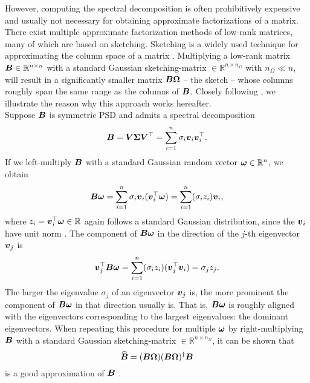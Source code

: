 However, computing the spectral
decomposition is often prohibitively expensive and usually not necessary for
obtaining approximate factorizations of a matrix. There exist multiple approximate
factorization methods of low-rank matrices, many of which are based on sketching.
Sketching is a widely used technique for approximating the column space of a matrix
\cite{halko2011finding,woodruff2014sketching,lin2017randomized,tropp2017sketching,tropp2023randomized}.
Multiplying a low-rank matrix $\boldsymbol{B} \in \mathbb{R}^{n \times n}$ with a standard Gaussian
\gls{sketching-matrix} $\in \mathbb{R}^{n \times n_{\Omega}}$ with $n_{\Omega} \ll n$, will
result in a significantly smaller matrix $\boldsymbol{B}\boldsymbol{\Omega}$ -- the sketch -- whose
columns roughly span the same range as the columns of $\boldsymbol{B}$.
Closely following \cite[section~2.1]{tropp2023randomized}, we illustrate the
reason why this approach works hereafter.\\

Suppose $\boldsymbol{B}$ is symmetric \gls{PSD} and admits a spectral decomposition
\begin{equation}
    \boldsymbol{B}
        = \boldsymbol{V} \boldsymbol{\Sigma} \boldsymbol{V}^{\top} 
        = \sum_{i=1}^n \sigma_i \boldsymbol{v}_i \boldsymbol{v}_i^{\top}.
    \label{equ:3-nystrom-sketching-spectral-decomposition}
\end{equation}
If we left-multiply $\boldsymbol{B}$ with a standard Gaussian random vector $\boldsymbol{\omega} \in \mathbb{R}^n$,
we obtain
\begin{equation}
    \boldsymbol{B}\boldsymbol{\omega}
        = \sum_{i=1}^n \sigma_i \boldsymbol{v}_i (\boldsymbol{v}_i^{\top} \boldsymbol{\omega})
        = \sum_{i=1}^n (\sigma_i  z_i) \boldsymbol{v}_i,
        \label{equ:3-nystrom-sketching-random-multiplication}
\end{equation}
where $z_i = \boldsymbol{v}_i^{\top} \boldsymbol{\omega} \in \mathbb{R}$ again follows a
standard Gaussian distribution, since the $\boldsymbol{v}_i$ have unit norm
\cite{klenke2013probability}. The component of $\boldsymbol{B}\boldsymbol{\omega}$ in the
direction of the $j$-th eigenvector $\boldsymbol{v}_j$ is
\begin{equation}
    \boldsymbol{v}_j^{\top}\boldsymbol{B}\boldsymbol{\omega}
        = \sum_{i=1}^n (\sigma_i  z_i) (\boldsymbol{v}_j^{\top} \boldsymbol{v}_i)
        = \sigma_j  z_j.
        \label{equ:3-nystrom-sketching-dominant-component}
\end{equation}
The larger the eigenvalue $\sigma_j$ of an eigenvector $\boldsymbol{v}_j$ is, the
more prominent the component of $\boldsymbol{B}\boldsymbol{\omega}$ in that direction usually is.
That is, $\boldsymbol{B}\boldsymbol{\omega}$ is roughly aligned with the eigenvectors corresponding
to the largest eigenvalues: the dominant eigenvectors.
When repeating this procedure for multiple $\boldsymbol{\omega}$ by right-multiplying $\boldsymbol{B}$
with a standard Gaussian \gls{sketching-matrix} $\in \mathbb{R}^{n \times n_{\Omega}}$,
it can be shown that
\begin{equation}
    \widehat{\boldsymbol{B}} = (\boldsymbol{B} \boldsymbol{\Omega}) (\boldsymbol{B} \boldsymbol{\Omega})^{\dagger} \boldsymbol{B}
    \label{equ:3-nystrom-RSVD}
\end{equation}
is a good approximation of $\boldsymbol{B}$ \cite{halko2011finding}.\\

